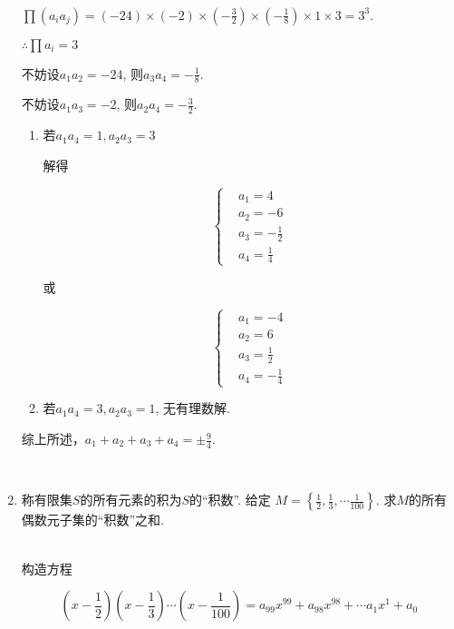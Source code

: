 \documentclass[8pt]{article}
\begin{document}
\begin{enumerate}
			~\\
			$\prod ( a_i a_j ) = (-24) \times (-2) \times \left(-\frac{3}{2}\right) \times \left(-\frac{1}{8}\right) \times 1 \times 3 = 3^3$.

			$\therefore \prod a_i = 3$

			不妨设$a_1 a_2 = -24$, 则$a_3 a_4 = -\frac{1}{8}$.

			不妨设$a_1 a_3 = -2$, 则$a_2 a_4 = -\frac{3}{2}$.

			\begin{enumerate}[ (i) ]

				\item
					若$a_1 a_4 = 1, a_2 a_3 = 3$

					解得

					$$\left \{
						\begin{aligned}
						&a_1 = 4 \\
						&a_2 = -6 \\
						&a_3 = -\frac{1}{2}\\
						&a_4 = \frac{1}{4}
						\end{aligned}
					\right.$$

					或

					$$\left \{
						\begin{aligned}
						&a_1 = -4 \\
						&a_2 = 6 \\
						&a_3 = \frac{1}{2}\\
						&a_4 = -\frac{1}{4}
						\end{aligned}
					\right.$$

				\item
					若$a_1 a_4 = 3, a_2 a_3 = 1$, 无有理数解.

			\end{enumerate}

			综上所述，$a_1 + a_2 + a_3 + a_4 = \pm \frac{9}{4}$.

		~\\

		\item

			称有限集$S$的所有元素的积为$S$的“积数”. 给定 $M = \left \{ \frac{1}{2}, \frac{1}{3}, \cdots \frac{1}{100} \right \}$. 求$M$的所有偶数元子集的“积数”之和.

			~\\
			构造方程

			$$\left(x-\frac{1}{2}\right)\left(x-\frac{1}{3}\right)\cdots\left(x-\frac{1}{100}\right)=a_{99} x^{99} + a_{98} x^{98} + \cdots a_1 x^1 + a_0$$


\end{enumerate}
\end{document}
